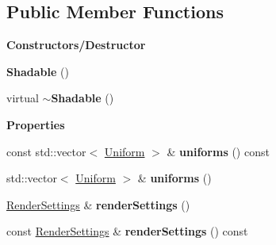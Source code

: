 \subsection*{Public Member Functions}
\begin{Indent}\textbf{ Constructors/\+Destructor}\par
\begin{DoxyCompactItemize}
\item 
\mbox{\label{classrev_1_1_shadable_adcd8026674e2cbf53cf8d4e336baf5cb}} 
{\bfseries Shadable} ()
\item 
\mbox{\label{classrev_1_1_shadable_afdc68f8f5509562d4dbbaff0cfb637d9}} 
virtual {\bfseries $\sim$\+Shadable} ()
\end{DoxyCompactItemize}
\end{Indent}
\begin{Indent}\textbf{ Properties}\par
\begin{DoxyCompactItemize}
\item 
\mbox{\label{classrev_1_1_shadable_a49323f95868a263bc3b4f1af5ed49ad0}} 
const std\+::vector$<$ \mbox{\hyperlink{structrev_1_1_uniform}{Uniform}} $>$ \& {\bfseries uniforms} () const
\item 
\mbox{\label{classrev_1_1_shadable_a8f6379b3cae5ce62c04c279071eb1497}} 
std\+::vector$<$ \mbox{\hyperlink{structrev_1_1_uniform}{Uniform}} $>$ \& {\bfseries uniforms} ()
\item 
\mbox{\label{classrev_1_1_shadable_a6fe7b8f8c4533ee65ecf278451204da0}} 
\mbox{\hyperlink{classrev_1_1_render_settings}{Render\+Settings}} \& {\bfseries render\+Settings} ()
\item 
\mbox{\label{classrev_1_1_shadable_a3c762dee4bd4df9807fc9c5b35a39d3c}} 
const \mbox{\hyperlink{classrev_1_1_render_settings}{Render\+Settings}} \& {\bfseries render\+Settings} () const
\end{DoxyCompactItemize}
\end{Indent}
